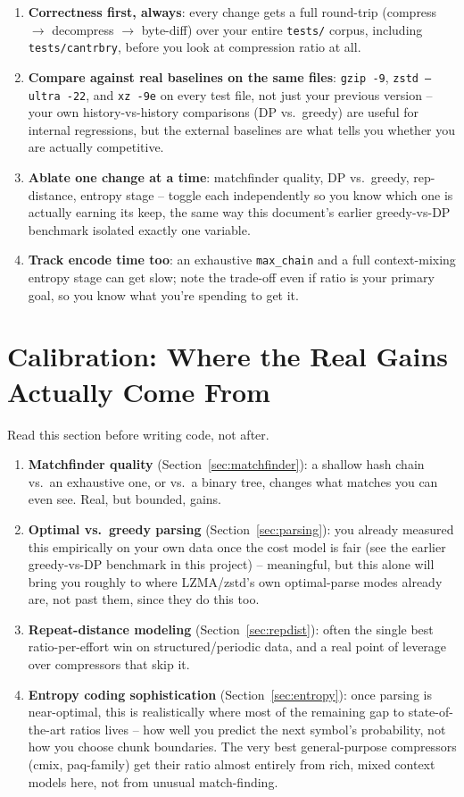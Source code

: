 \documentclass[11pt]{article}
\begin{document}
\begin{enumerate}
  \item \textbf{Correctness first, always}: every change gets a full round-trip
  (compress $\to$ decompress $\to$ byte-diff) over your entire \texttt{tests/} corpus,
  including \texttt{tests/cantrbry}, before you look at compression ratio at all.
  \item \textbf{Compare against real baselines on the same files}: \texttt{gzip -9},
  \texttt{zstd --ultra -22}, and \texttt{xz -9e} on every test file, not just your
  previous version -- your own history-vs-history comparisons (DP vs.\ greedy) are
  useful for internal regressions, but the external baselines are what tells you whether
  you are actually competitive.
  \item \textbf{Ablate one change at a time}: matchfinder quality, DP vs.\ greedy,
  rep-distance, entropy stage -- toggle each independently so you know which one is
  actually earning its keep, the same way this document's earlier greedy-vs-DP
  benchmark isolated exactly one variable.
  \item \textbf{Track encode time too}: an exhaustive \texttt{max\_chain} and a full
  context-mixing entropy stage can get slow; note the trade-off even if ratio is your
  primary goal, so you know what you're spending to get it.
\end{enumerate}

\section{Calibration: Where the Real Gains Actually Come From}
\label{sec:calibration}

Read this section before writing code, not after.

\begin{enumerate}
  \item \textbf{Matchfinder quality} (Section~\ref{sec:matchfinder}): a shallow hash
  chain vs.\ an exhaustive one, or vs.\ a binary tree, changes what matches you can even
  see. Real, but bounded, gains.
  \item \textbf{Optimal vs.\ greedy parsing} (Section~\ref{sec:parsing}): you already
  measured this empirically on your own data once the cost model is fair (see the
  earlier greedy-vs-DP benchmark in this project) -- meaningful, but this alone will
  bring you roughly to where LZMA/zstd's own optimal-parse modes already are, not past
  them, since they do this too.
  \item \textbf{Repeat-distance modeling} (Section~\ref{sec:repdist}): often the single
  best ratio-per-effort win on structured/periodic data, and a real point of leverage
  over compressors that skip it.
  \item \textbf{Entropy coding sophistication} (Section~\ref{sec:entropy}): once parsing
  is near-optimal, this is realistically where most of the remaining gap to
  state-of-the-art ratios lives -- how well you predict the next symbol's probability,
  not how you choose chunk boundaries. The very best general-purpose compressors (cmix,
  paq-family) get their ratio almost entirely from rich, mixed context models here, not
  from unusual match-finding.
\end{enumerate}
\end{document}
